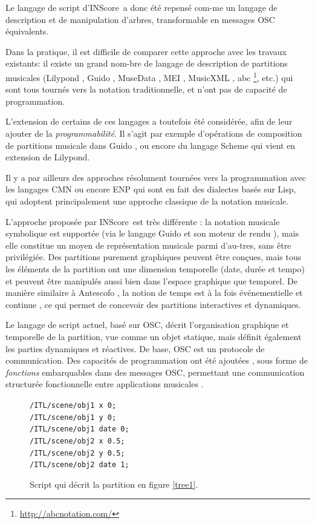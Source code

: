 \documentclass{article}
\newcommand{\IS}		{INScore}
\newcommand{\code}	[2][0.9]		{\vspace{0mm}\begin{center}\colorbox{mygrey}{
							\begin{minipage}[t]{#1\columnwidth} 
							{\small \texttt{#2}}
							\end{minipage}}\end{center}}
\begin{document}
Le langage de script d'\IS\ a donc été repensé com-me un langage de description et de manipulation d'arbres, transformable en messages OSC équivalents.

Dans la pratique, il est difficile de comparer cette approche avec les travaux existants: il existe un grand nom-bre de langage de description de partitions musicales (Lilypond \cite{lilypond03}, Guido \cite{hoos98}, MuseData \cite{Hewlett97}, MEI \cite{Roland_2002}, MusicXML \cite{good01}, abc \footnote{\url{http://abcnotation.com/}}, etc.) qui sont tous tournés vers la notation traditionnelle, et n'ont pas de capacité de programmation. 

L'extension de certains de ces langages a toutefois été considérée, afin de leur ajouter de la \textit{programmabilité}. Il s'agit par exemple d'opérations de composition de partitions musicale dans Guido \cite{fober12b}, ou encore du langage Scheme qui vient en extension de Lilypond.

Il y a par ailleurs des approches résolument tournées vers la programmation avec les langages CMN \cite{Schottstaedt97} ou encore ENP 
\cite{KUUSK06} qui sont en fait des dialectes basés sur Lisp, qui adoptent principalement une approche classique de la notation musicale.

L'approche proposée par \IS\ est très différente : la notation musicale symbolique est supportée (via le langage Guido et son moteur de rendu \cite{Dau:09b,hoos98}), mais elle constitue un moyen de représentation musicale parmi d'au-tres, sans être privilégiée. 
Des partitions purement graphiques peuvent être conçues, mais tous les éléments de la partition ont une dimension temporelle (date, durée et tempo) et peuvent être manipulés aussi bien dans l'espace graphique que temporel. De manière similaire à Antescofo \cite{acont08}, la notion de temps est à la fois événementielle et continue \cite{fober17c}, ce qui permet de concevoir des partitions interactives et dynamiques.

Le langage de script actuel, basé sur OSC, décrit l'organisation graphique et temporelle de la partition, vue comme un objet statique, mais définit également les parties dynamiques et réactives.
De base, OSC est un protocole de communication. Des capacités de programmation ont été ajoutées \cite{429}, sous forme de \emph{fonctions} embarquables dans des messages OSC, permettant une communication structurée fonctionnelle entre applications musicales \cite{bresson:hal-01353794}. 

\begin{figure}[htbp]
\code{/ITL/scene/obj1 x 0;\\
/ITL/scene/obj1 y    0;\\
/ITL/scene/obj1 date 0;\\
/ITL/scene/obj2 x    0.5;\\
/ITL/scene/obj2 y    0.5;\\
/ITL/scene/obj2 date 1;
}
\caption{Script qui décrit la partition en figure \ref{tree1}.}
\label{script1}
\end{figure}
\end{document}
